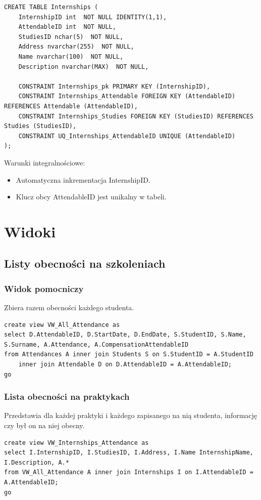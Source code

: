 \documentclass[11pt,a4paper]{article}
\begin{document}
\begin{Verbatim}[breaklines=true]
CREATE TABLE Internships (
    InternshipID int  NOT NULL IDENTITY(1,1),
    AttendableID int  NOT NULL,
    StudiesID nchar(5)  NOT NULL,
    Address nvarchar(255)  NOT NULL,
    Name nvarchar(100)  NOT NULL,
    Description nvarchar(MAX)  NOT NULL,

    CONSTRAINT Internships_pk PRIMARY KEY (InternshipID),
    CONSTRAINT Internships_Attendable FOREIGN KEY (AttendableID) REFERENCES Attendable (AttendableID),
    CONSTRAINT Internships_Studies FOREIGN KEY (StudiesID) REFERENCES Studies (StudiesID),
    CONSTRAINT UQ_Internships_AttendableID UNIQUE (AttendableID)
);
\end{Verbatim}

Warunki integralnościowe:
\begin{itemize}
    \item Automatyczna inkrementacja InternshipID.
    \item Klucz obcy AttendableID jest unikalny w tabeli.
\end{itemize}

\section{Widoki}
\subsection{Listy obecności na szkoleniach}

\subsubsection{Widok pomocniczy}
Zbiera razem obecności każdego studenta.
\begin{Verbatim}[breaklines=true]
create view VW_All_Attendance as
select D.AttendableID, D.StartDate, D.EndDate, S.StudentID, S.Name, S.Surname, A.Attendance, A.CompensationAttendableID
from Attendances A inner join Students S on S.StudentID = A.StudentID
    inner join Attendable D on D.AttendableID = A.AttendableID;
go
\end{Verbatim}

\subsubsection{Lista obecności na praktykach}
Przedstawia dla każdej praktyki i każdego zapisanego na nią studenta, informację czy był on na niej obecny.
\begin{Verbatim}[breaklines=true]
create view VW_Internships_Attendance as
select I.InternshipID, I.StudiesID, I.Address, I.Name InternshipName, I.Description, A.*
from VW_All_Attendance A inner join Internships I on I.AttendableID = A.AttendableID;
go
\end{Verbatim}
\end{document}
